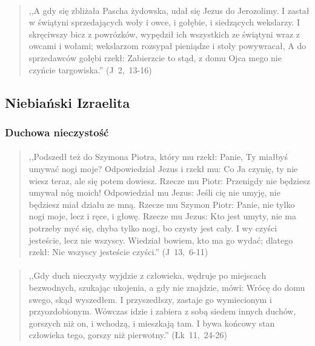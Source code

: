 \documentclass[10pt,a4paper,oneside]{article}
\begin{document}
\paragraph{}
\begin{quote}
,,A gdy się zbliżała Pascha żydowska, udał się Jezus do Jerozolimy. I zastał w świątyni sprzedających woły i owce, i gołębie, i siedzących wekslarzy. I skręciwszy bicz z powrózków, wypędził ich wszystkich ze świątyni wraz z owcami i wołami; wekslarzom rozsypał pieniądze i stoły powywracał, A do sprzedawców gołębi rzekł: Zabierzcie to stąd, z domu Ojca mego nie czyńcie targowiska.'' \mbox{(J 2, 13-16)}
\end{quote}
\subsection{Niebiański Izraelita}
\subsubsection{Duchowa nieczystość}
\paragraph{}
\begin{quote}
,,Podszedł też do Szymona Piotra, który mu rzekł: Panie, Ty miałbyś umywać nogi moje? Odpowiedział Jezus i rzekł mu: Co Ja czynię, ty nie wiesz teraz, ale się potem dowiesz. Rzecze mu Piotr: Przenigdy nie będziesz umywał nóg moich! Odpowiedział mu Jezus: Jeśli cię nie umyję, nie będziesz miał działu ze mną. Rzecze mu Szymon Piotr: Panie, nie tylko nogi moje, lecz i ręce, i głowę. Rzecze mu Jezus: Kto jest umyty, nie ma potrzeby myć się, chyba tylko nogi, bo czysty jest cały. I wy czyści jesteście, lecz nie wszyscy. Wiedział bowiem, kto ma go wydać; dlatego rzekł: Nie wszyscy jesteście czyści.'' \mbox{(J 13, 6-11)}
\end{quote}
\paragraph{}
\begin{quote}
,,Gdy duch nieczysty wyjdzie z człowieka, wędruje po miejscach bezwodnych, szukając ukojenia, a gdy nie znajdzie, mówi: Wrócę do domu swego, skąd wyszedłem. I przyszedłszy, zastaje go wymiecionym i przyozdobionym. Wówczas idzie i zabiera z sobą siedem innych duchów, gorszych niż on, i wchodzą, i mieszkają tam. I bywa końcowy stan człowieka tego, gorszy niż pierwotny.'' \mbox{(Łk 11, 24-26)}
\end{quote}
\end{document}
